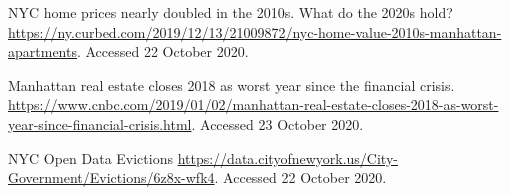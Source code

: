 \documentclass[a4paper, 12pt]{article}
\numberwithin{equation}{section}
\begin{document}
\begin{thebibliography}{20}
         NYC home prices nearly doubled in the 2010s. What do the 2020s hold? \url{https://ny.curbed.com/2019/12/13/21009872/nyc-home-value-2010s-manhattan-apartments}. Accessed 22 October 2020.
        
         Manhattan real estate closes 2018 as worst year since the financial crisis. \url{https://www.cnbc.com/2019/01/02/manhattan-real-estate-closes-2018-as-worst-year-since-financial-crisis.html}. Accessed 23 October 2020.
        
         NYC Open Data Evictions \url{https://data.cityofnewyork.us/City-Government/Evictions/6z8x-wfk4}. Accessed 22 October 2020.
		
	\end{thebibliography}
	
\end{document}
